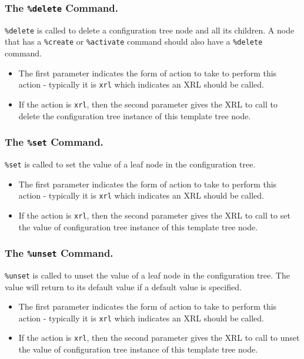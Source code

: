 \documentclass[11pt]{article}
\begin{document}
\subsubsection{The {\tt \%delete} Command.}
{\tt \%delete} is called to delete a configuration tree node and all its
children.  A node that has a {\tt \%create} or {\tt \%activate}
command should also have a {\tt \%delete} command.
\begin{itemize}
\item The first parameter indicates the form of action to take to perform
this action - typically it is {\tt xrl} which indicates an XRL should
be called.
\item If the action is {\tt xrl}, then the second parameter gives the XRL to
call to delete the configuration tree instance of this template tree
node.
\end{itemize}

\subsubsection{The {\tt \%set} Command.}
{\tt \%set} is called to set the value of a leaf node in the
configuration tree.
\begin{itemize}
\item The first parameter indicates the form of action to take to perform
this action - typically it is {\tt xrl} which indicates an XRL should
be called.
\item If the action is {\tt xrl}, then the second parameter gives the XRL to
call to set the value of configuration tree instance of this template
tree node.
\end{itemize}
\subsubsection{The {\tt \%unset} Command.}
{\tt \%unset} is called to unset the value of a leaf node in the
configuration tree.  The value will return to its default value if a
default value is specified.
\begin{itemize}
\item The first parameter indicates the form of action to take to perform
this action - typically it is {\tt xrl} which indicates an XRL should
be called.
\item If the action is {\tt xrl}, then the second parameter gives the XRL to
call to unset the value of configuration tree instance of this template
tree node.
\end{itemize}
\end{document}
